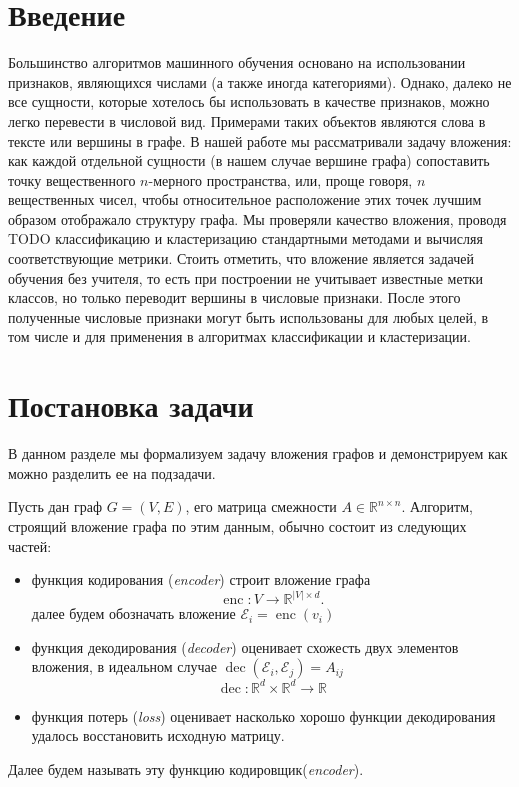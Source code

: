 \documentclass[12pt,a4paper]{extarticle}
\newcommand{\R}{\mathbb{R}}
\newcommand{\E}{\mathcal{E}}
\newcommand{\encoder}{\operatorname{enc}}
\newcommand{\decoder}{\operatorname{dec}}
\begin{document}
    \tableofcontents

    \newpage

    \section{Введение}
    Большинство алгоритмов машинного обучения основано на использовании
    признаков, являющихся числами (а также иногда категориями).
    Однако, далеко не все сущности, которые хотелось бы использовать в качестве признаков,
    можно легко перевести в числовой вид.
    Примерами таких объектов являются слова в тексте или вершины в графе.
    В нашей работе мы рассматривали задачу вложения: как каждой отдельной сущности (в нашем
    случае вершине графа) сопоставить точку вещественного $n$-мерного пространства,
    или, проще говоря, $n$ вещественных чисел, чтобы относительное
    расположение этих точек лучшим образом отображало структуру графа.
    Мы проверяли качество вложения, проводя TODO классификацию и кластеризацию
    стандартными методами и вычисляя соответствующие метрики.
    Стоить отметить, что вложение является задачей обучения без учителя,
    то есть при построении не учитывает известные метки классов, но только
    переводит вершины в числовые признаки.
    После этого полученные числовые признаки могут быть использованы для любых целей, в том числе и для
    применения в алгоритмах классификации и кластеризации.

    \section{Постановка задачи}
    В данном разделе мы формализуем задачу вложения графов и демонстрируем как можно разделить ее на подзадачи.

    Пусть дан граф $G = (V, E)$, его матрица смежности $A \in \R^{n \times n}$.
    Алгоритм, строящий вложение графа по этим данным, обычно состоит из следующих частей:
    \begin{itemize}
        \item функция кодирования (\textit{encoder}) строит вложение графа
            \[\encoder: V \to \R^{|V| \times d}.\]
            далее будем обозначать вложение $\E_i = \encoder(v_i)$
        \item функция декодирования (\textit{decoder}) оценивает схожесть двух элементов вложения,
            в идеальном случае $\decoder(\E_i, \E_j) = A_{ij}$
            \[\decoder: \R^{d} \times \R^{d} \to \R\]
        \item функция потерь (\textit{loss}) оценивает насколько хорошо функции декодирования удалось
            восстановить исходную матрицу.
    \end{itemize}
    
    Далее будем называть эту функцию кодировщик(\textit{encoder}).


    \subsection{}



    
    
\end{document}
